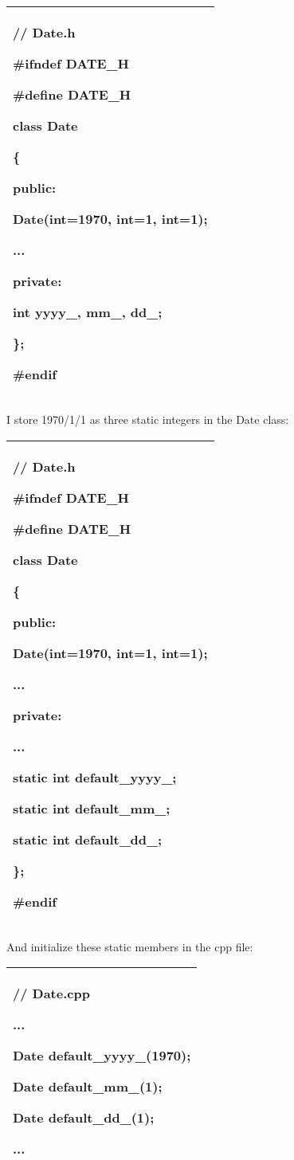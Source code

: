 \documentclass[
]{article}
\begin{document}
\begin{longtable}[]{@{}l@{}}
\toprule
\endhead
\begin{minipage}[t]{0.97\columnwidth}\raggedright
// Date.h

\#ifndef DATE\_H

\#define DATE\_H

class Date

\{

public:

Date(int=\textbf{1970}, int=\textbf{1}, int=\textbf{1});

...

private:

int yyyy\_, mm\_, dd\_;

\};

\#endif\strut
\end{minipage}\tabularnewline
\bottomrule
\end{longtable}

I store 1970/1/1 as three static integers in the Date class:

\begin{longtable}[]{@{}l@{}}
\toprule
\endhead
\begin{minipage}[t]{0.97\columnwidth}\raggedright
// Date.h

\#ifndef DATE\_H

\#define DATE\_H

class Date

\{

public:

Date(int=1970, int=1, int=1);

...

private:

...

\textbf{static int default\_yyyy\_;}

\textbf{static int default\_mm\_;}

\textbf{static int default\_dd\_;}

\};

\#endif\strut
\end{minipage}\tabularnewline
\bottomrule
\end{longtable}

And initialize these static members in the cpp file:

\begin{longtable}[]{@{}l@{}}
\toprule
\endhead
\begin{minipage}[t]{0.97\columnwidth}\raggedright
// Date.cpp

...

Date default\_yyyy\_(1970);

Date default\_mm\_(1);

Date default\_dd\_(1);

...\strut
\end{minipage}\tabularnewline
\bottomrule
\end{longtable}
\end{document}
